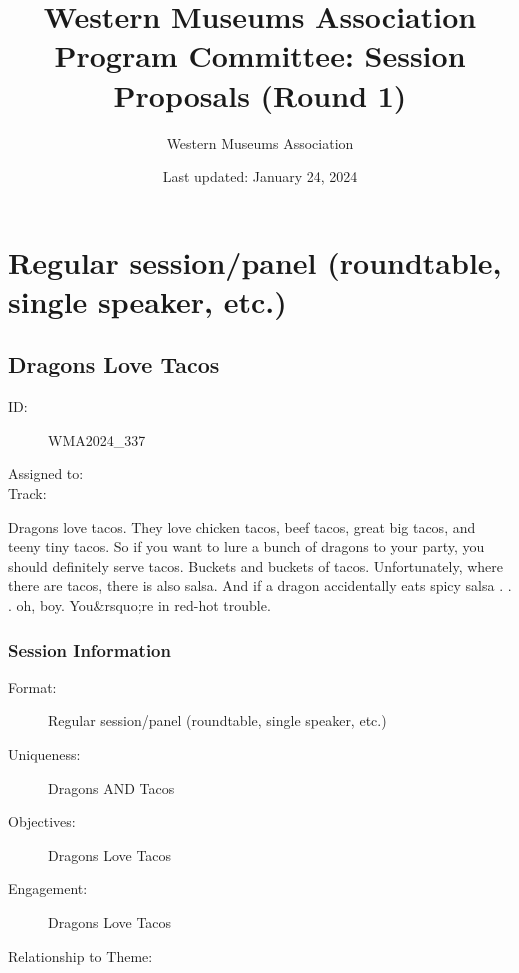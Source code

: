 \documentclass{report}
\title{ Western Museums Association Program Committee: Session Proposals (Round 1)}
\date{ Last updated: January 24, 2024}
\author{Western Museums Association}
\begin{document}
  \maketitle
  \newpage
  \tableofcontents
  \newpage
  
    \newpage
    \chapter*{ Regular session/panel (roundtable, single speaker, etc.) }

      
        
          \newpage
          \section{ Dragons Love Tacos }
            \begin{description}
              \item [ID:]
              WMA2024\_337

              \item [Assigned to:]
                \item [Track:]
              \end{description}

              Dragons love tacos. They love chicken tacos, beef tacos, great big tacos, and teeny tiny tacos. So if you want to lure a bunch of dragons to your party, you should definitely serve tacos. Buckets and buckets of tacos. Unfortunately, where there are tacos, there is also salsa. And if a dragon accidentally eats spicy salsa . . . oh, boy. You\&rsquo;re in red-hot trouble.

              \subsection*{Session Information}
                \begin{description}
                  \item [Format:] Regular session/panel (roundtable, single speaker, etc.)
							    
							    \item [Uniqueness:]Dragons AND Tacos
							    \item [Objectives:]Dragons Love Tacos
							    \item [Engagement:]Dragons Love Tacos
							    \item [Relationship to Theme:]
							    
                \end{description}
\end{document}
